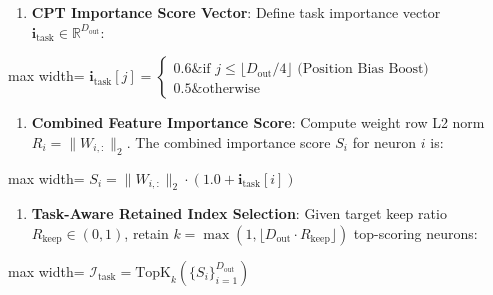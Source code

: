 \begin{enumerate}
\item \textbf{CPT Importance Score Vector}:
Define task importance vector $\mathbf{i}_{\text{task}} \in \mathbb{R}^{D_{\text{out}}}$:
\end{enumerate}
\begin{center}
\begin{adjustbox}{max width=\columnwidth}
$\displaystyle
\mathbf{i}_{\text{task}}[j] = \begin{cases} 0.6 \& \text{if } j \le \lfloor D_{\text{out}} / 4 \rfloor \text{ (Position Bias Boost)} \\ 0.5 \& \text{otherwise} \end{cases}
$
\end{adjustbox}
\end{center}

\begin{enumerate}
\item \textbf{Combined Feature Importance Score}:
Compute weight row L2 norm $R_i = \| W_{i, :} \|_2$. The combined importance score $S_i$ for neuron $i$ is:
\end{enumerate}
\begin{center}
\begin{adjustbox}{max width=\columnwidth}
$\displaystyle
S_i = \| W_{i, :} \|_2 \cdot \left( 1.0 + \mathbf{i}_{\text{task}}[i] \right)
$
\end{adjustbox}
\end{center}

\begin{enumerate}
\item \textbf{Task-Aware Retained Index Selection}:
Given target keep ratio $R_{\text{keep}} \in (0, 1)$, retain $k = \max(1, \lfloor D_{\text{out}} \cdot R_{\text{keep}} \rfloor)$ top-scoring neurons:
\end{enumerate}
\begin{center}
\begin{adjustbox}{max width=\columnwidth}
$\displaystyle
\mathcal{I}_{\text{task}} = \text{TopK}_k\left( \{ S_i \}_{i=1}^{D_{\text{out}}} \right)
$
\end{adjustbox}
\end{center}

